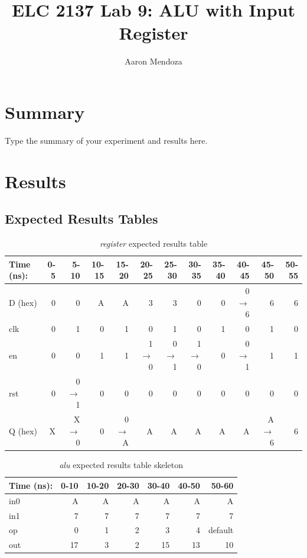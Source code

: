 \documentclass[11pt]{article}
\begin{document}
\title{ELC 2137 Lab 9: ALU with Input Register}
\author{Aaron Mendoza}

\maketitle


\section*{Summary}

Type the summary of your experiment and results here.  





\section*{Results}

\subsection*{Expected Results Tables}

\begin{table}[ht]\centering
	\caption{\textit{register} expected results table}
	\label{ALU:tbl:register_ERT}\medskip
	\begin{tabular}{l|rrrrrrrrrrr}
		Time (ns): & 0-5 & 5-10 & 10-15 & 15-20 & 20-25 & 25-30 & 30-35 & 35-40 & 40-45 & 45-50 & 50-55 \\
		\midrule
		D (hex) & 0 & 0 	  & A & A & 3 	    & 3 	  & 0 	    & 0 & 0$\to$6 & 6 & 6 \\
		clk     & 0 & 1 	  & 0 & 1 & 0 	    & 1 	  & 0 	    & 1 & 0 	  & 1 & 0 \\
		en  	& 0 & 0 	  & 1 & 1 & 1$\to$0 & 0$\to$1 & 1$\to$0 & 0 & 0$\to$1 & 1 & 1 \\
		rst 	& 0 & 0$\to$1 & 0 & 0 & 0 		& 0 	  & 0		& 0 & 0		  & 0 & 0 \\
		\midrule
		Q (hex) & X & X$\to$0 & 0 & 0$\to$A & A & A & A & A & A & A$\to$6 & 6\\
		\bottomrule
	\end{tabular}
\end{table}
\FloatBarrier

\begin{table}[ht]\centering
	\caption{\textit{alu} expected results table skeleton}
	\label{ALU:tbl:alu_ERT}\medskip
	\begin{tabular}{l|rrrrrr}
		Time (ns): & 0-10 & 10-20 & 20-30 & 30-40 & 40-50 & 50-60 \\
		\midrule
		in0 & A & A & A & A & A & A \\
		in1 & 7 & 7 & 7 & 7 & 7 & 7 \\
		op	& 0 & 1 & 2 & 3 & 4 & default \\
		\midrule
		out & 17 & 3 & 2 & 15 & 13 & 10 \\
		\bottomrule
	\end{tabular}
\end{table}
\end{document}
